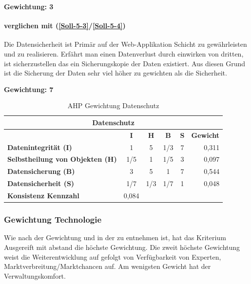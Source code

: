 \textbf{Gewichtung: 3}

\paragraph*{ verglichen mit  (\ref{Soll-5-3}/\ref{Soll-5-4})}
Die Datensicherheit ist Primär auf der Web-Applikation Schicht zu gewährleisten und zu realisieren. Erfährt man einen Datenverlust durch einwirken von dritten, ist sicherzustellen das ein Sicherungskopie der Daten existiert. Aus diesen Grund ist die Sicherung der Daten sehr viel höher zu gewichten als die Sicherheit. 

\textbf{Gewichtung: 7}

\begin{table}[htbp]
\caption{AHP Gewichtung Datenschutz}
\begin{tabular}{|l|c|c|c|c|l|}
\hline
\multicolumn{6}{|c|}{\textbf{Datenschutz}} \\ \hline
 & \multicolumn{1}{c|}{\textbf{I}} & \multicolumn{1}{c|}{\textbf{H}} & \multicolumn{1}{c|}{\textbf{B}} & \multicolumn{1}{c|}{\textbf{S}} & \multicolumn{1}{l|}{\textbf{Gewicht}} \\ \hline
\textbf{Datenintegrität (I)} & 1 & 5 & 1/3 & 7 & \multicolumn{1}{r|}{0,311} \\ \hline
\textbf{Selbstheilung von Objekten (H)} & 1/5 & 1 & 1/5 & 3 & \multicolumn{1}{r|}{0,097} \\ \hline
\textbf{Datensicherung (B)} & 3 & 5 & 1 & 7 & \multicolumn{1}{r|}{0,544} \\ \hline
\textbf{Datensicherheit (S)} & 1/7 & 1/3 & 1/7 & 1 & \multicolumn{1}{r|}{0,048} \\ \hline
\textbf{Konsistenz Kennzahl} & 0,084 \\ \cline{1-2}
\end{tabular}
\label{tab:AHPDatenschutz}
\end{table}

\subsubsection*{Gewichtung Technologie}

Wie nach der Gewichtung und in der  zu entnehmen ist, hat das Kriterium Ausgereift mit abstand die höchste Gewichtung. Die zweit höchste Gewichtung weist die Weiterentwicklung auf gefolgt von Verfügbarkeit von Experten, Marktverbreitung/Marktchancen auf. Am wenigsten Gewicht hat der Verwaltungskomfort.

